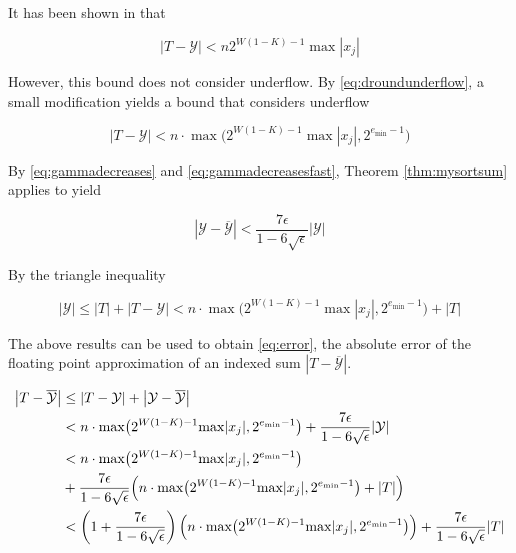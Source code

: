     It has been shown in \cite{repsum} that

    \begin{equation}
      \label{eq:repboundnaive}
      |T - \mathcal{Y}| < n  2^{W  (1 - K) - 1}\max|x_j|
    \end{equation}

    However, this bound does not consider underflow. By  \eqref{eq:droundunderflow}, a small modification yields a bound that considers underflow

    \begin{equation}
      \label{eq:repbound}
      |T - \mathcal{Y}| < n \cdot \max\bigl(2^{W  (1 - K) - 1} \max|x_j|, 2^{e_{\min} - 1}\bigr)
    \end{equation}

    By  \eqref{eq:gammadecreases} and \eqref{eq:gammadecreasesfast}, Theorem \ref{thm:mysortsum} applies to yield

    \begin{equation*}
      \left|\mathcal{Y} - \overline{\mathcal{Y}}\right| < \frac{7\epsilon}{1 - 6\sqrt\epsilon}|\mathcal{Y}|
    \end{equation*}

    By the triangle inequality

    \begin{equation*}
      |\mathcal{Y}| \leq |T| + |T - \mathcal{Y}| < n \cdot \max\bigl(2^{W  (1 - K) - 1}  \max|x_j|, 2^{e_{\min} - 1}\bigr) + |T|
    \end{equation*}

    The above results can be used to obtain  \eqref{eq:error}, the absolute error of the floating point approximation of an indexed sum $|T - \overline{\mathcal{Y}}|$.

    \begin{align}
      \left|T - \overline{\mathcal{Y}}\right| &\leq |T - \mathcal{Y}| + \left|\mathcal{Y} - \overline{\mathcal{Y}}\right| \nonumber \\
      &< n \cdot \max\bigl(2^{W  (1 - K) - 1}  \max|x_j|, 2^{e_{\min} - 1}\bigr) + \frac{7\epsilon}{1 - 6\sqrt\epsilon} |\mathcal{Y}| \nonumber \\
      &< n \cdot \max\bigl(2^{W  (1 - K) - 1}  \max|x_j|, 2^{e_{\min} - 1}\bigr) \nonumber \\
      &+ \frac{7\epsilon}{1 - 6\sqrt\epsilon} \Bigl(n \cdot \max\bigl(2^{W  (1 - K) - 1}  \max|x_j|, 2^{e_{\min} - 1}\bigr) + |T|\Bigr) \nonumber \\
      &< \left(1 + \frac{7\epsilon}{1 - 6\sqrt\epsilon}\right) \Bigl(n \cdot \max\bigl(2^{W (1 - K) - 1} \max|x_j|, 2^{e_{\min} - 1}\bigr)\Bigr) + \frac{7\epsilon}{1 - 6\sqrt\epsilon} |T|
      \label{eq:error}
    \end{align}

